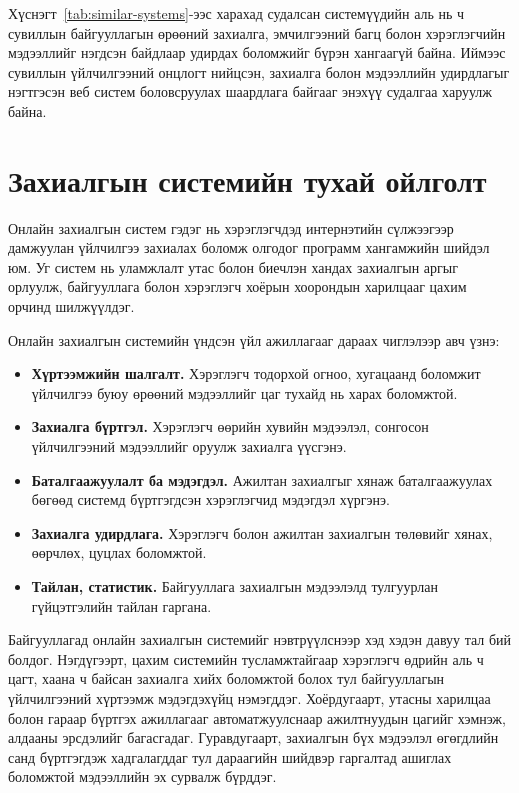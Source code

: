 Хүснэгт~\ref{tab:similar-systems}-ээс харахад судалсан системүүдийн аль нь ч сувиллын байгууллагын өрөөний захиалга, эмчилгээний багц болон хэрэглэгчийн мэдээллийг нэгдсэн байдлаар удирдах боломжийг бүрэн хангаагүй байна. Иймээс сувиллын үйлчилгээний онцлогт нийцсэн, захиалга болон мэдээллийн удирдлагыг нэгтгэсэн веб систем боловсруулах шаардлага байгааг энэхүү судалгаа харуулж байна.

\section{Захиалгын системийн тухай ойлголт}

Онлайн захиалгын систем гэдэг нь хэрэглэгчдэд интернэтийн сүлжээгээр дамжуулан үйлчилгээ захиалах боломж олгодог программ хангамжийн шийдэл юм. Уг систем нь уламжлалт утас болон биечлэн хандах захиалгын аргыг орлуулж, байгууллага болон хэрэглэгч хоёрын хоорондын харилцааг цахим орчинд шилжүүлдэг.

Онлайн захиалгын системийн үндсэн үйл ажиллагааг дараах чиглэлээр авч үзнэ:

\begin{itemize}
  \item \textbf{Хүртээмжийн шалгалт.} Хэрэглэгч тодорхой огноо, хугацаанд боломжит үйлчилгээ буюу өрөөний мэдээллийг цаг тухайд нь харах боломжтой.
  \item \textbf{Захиалга бүртгэл.} Хэрэглэгч өөрийн хувийн мэдээлэл, сонгосон үйлчилгээний мэдээллийг оруулж захиалга үүсгэнэ.
  \item \textbf{Баталгаажуулалт ба мэдэгдэл.} Ажилтан захиалгыг хянаж баталгаажуулах бөгөөд системд бүртгэгдсэн хэрэглэгчид мэдэгдэл хүргэнэ.
  \item \textbf{Захиалга удирдлага.} Хэрэглэгч болон ажилтан захиалгын төлөвийг хянах, өөрчлөх, цуцлах боломжтой.
  \item \textbf{Тайлан, статистик.} Байгууллага захиалгын мэдээлэлд тулгуурлан гүйцэтгэлийн тайлан гаргана.
\end{itemize}

Байгууллагад онлайн захиалгын системийг нэвтрүүлснээр хэд хэдэн давуу тал бий болдог. Нэгдүгээрт, цахим системийн тусламжтайгаар хэрэглэгч өдрийн аль ч цагт, хаана ч байсан захиалга хийх боломжтой болох тул байгууллагын үйлчилгээний хүртээмж мэдэгдэхүйц нэмэгддэг. Хоёрдугаарт, утасны харилцаа болон гараар бүртгэх ажиллагааг автоматжуулснаар ажилтнуудын цагийг хэмнэж, алдааны эрсдэлийг багасгадаг. Гуравдугаарт, захиалгын бүх мэдээлэл өгөгдлийн санд бүртгэгдэж хадгалагддаг тул дараагийн шийдвэр гаргалтад ашиглах боломжтой мэдээллийн эх сурвалж бүрддэг.

